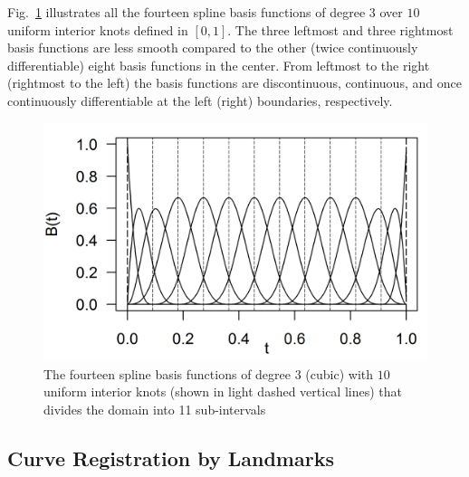 Fig.~\ref{fig:b_spline} illustrates all the fourteen spline basis functions of degree $3$ over $10$ uniform interior knots defined in $[0,1]$.
The three leftmost and three rightmost basis functions are less smooth compared to the other (twice continuously differentiable) eight basis functions in the center. 
From leftmost to the right (rightmost to the left) the basis functions are discontinuous, continuous, and once continuously differentiable at the left (right) boundaries, respectively.
\begin{figure}[bth]
	\centering
	\includegraphics[scale=0.9,trim={0 0.15cm 0 0},clip]{../figures/r-figures/bSpline.png}
	\caption[Spline basis functions of order $4$]{The fourteen spline basis functions of degree $3$ (cubic) with $10$ uniform interior knots (shown in light dashed vertical lines) that divides the domain into 11 sub-intervals}
	\label{fig:b_spline}
\end{figure}

\subsection{Curve Registration by Landmarks}\label{sub:sa_registration}

